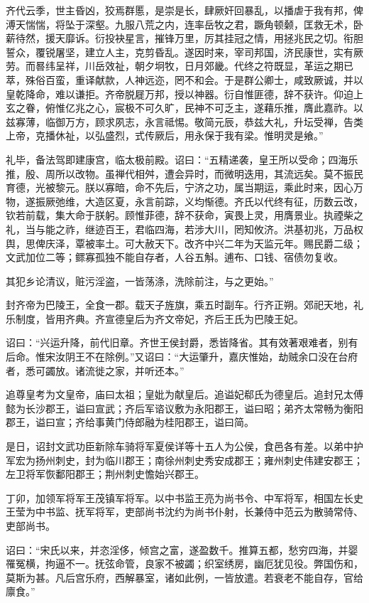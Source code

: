 \documentclass[12pt,UTF8]{ctexbook}
\begin{document}
齐代云季，世主昏凶，狡焉群慝，是崇是长，肆厥奸回暴乱，以播虐于我有邦，俾溥天惴惴，将坠于深壑。九服八荒之内，连率岳牧之君，蹶角顿颡，匡救无术，卧薪待然，援天靡诉。衍投袂星言，摧锋万里，厉其挂冠之情，用拯兆民之切。衔胆誓众，覆锐屠坚，建立人主，克剪昏乱。遂因时来，宰司邦国，济民康世，实有厥劳。而晷纬呈祥，川岳效祉，朝夕坰牧，日月郊畿。代终之符既显，革运之期已萃，殊俗百蛮，重译献款，人神远迩，罔不和会。于是群公卿士，咸致厥诚，并以皇乾降命，难以谦拒。齐帝脱屣万邦，授以神器。衍自惟匪德，辞不获许。仰迫上玄之眷，俯惟亿兆之心，宸极不可久旷，民神不可乏主，遂藉乐推，膺此嘉祚。以兹寡薄，临御万方，顾求夙志，永言祗惕。敬简元辰，恭兹大礼，升坛受禅，告类上帝，克播休祉，以弘盛烈，式传厥后，用永保于我有梁。惟明灵是飨。”

礼毕，备法驾即建康宫，临太极前殿。诏曰：“五精递袭，皇王所以受命；四海乐推，殷、周所以改物。虽禅代相舛，遭会异时，而微明迭用，其流远矣。莫不振民育德，光被黎元。朕以寡暗，命不先后，宁济之功，属当期运，乘此时来，因心万物，遂振厥弛维，大造区夏，永言前踪，义均惭德。齐氏以代终有征，历数云改，钦若前载，集大命于朕躬。顾惟菲德，辞不获命，寅畏上灵，用膺景业。执禋柴之礼，当与能之祚，继迹百王，君临四海，若涉大川，罔知攸济。洪基初兆，万品权舆，思俾庆泽，覃被率土。可大赦天下。改齐中兴二年为天监元年。赐民爵二级；文武加位二等；鳏寡孤独不能自存者，人谷五斛。逋布、口钱、宿债勿复收。

其犯乡论清议，赃污淫盗，一皆荡涤，洗除前注，与之更始。”

封齐帝为巴陵王，全食一郡。载天子旌旗，乘五时副车。行齐正朔。郊祀天地，礼乐制度，皆用齐典。齐宣德皇后为齐文帝妃，齐后王氏为巴陵王妃。

诏曰：“兴运升降，前代旧章。齐世王侯封爵，悉皆降省。其有效著艰难者，别有后命。惟宋汝阴王不在除例。”又诏曰：“大运肇升，嘉庆惟始，劫贼余口没在台府者，悉可蠲放。诸流徙之家，并听还本。”

追尊皇考为文皇帝，庙曰太祖；皇妣为献皇后。追谥妃郗氏为德皇后。追封兄太傅懿为长沙郡王，谥曰宣武；齐后军谘议敷为永阳郡王，谥曰昭；弟齐太常畅为衡阳郡王，谥曰宣；齐给事黄门侍郎融为桂阳郡王，谥曰简。

是日，诏封文武功臣新除车骑将军夏侯详等十五人为公侯，食邑各有差。以弟中护军宏为扬州刺史，封为临川郡王；南徐州刺史秀安成郡王；雍州刺史伟建安郡王；左卫将军恢鄱阳郡王；荆州刺史憺始兴郡王。

丁卯，加领军将军王茂镇军将军。以中书监王亮为尚书令、中军将军，相国左长史王莹为中书监、抚军将军，吏部尚书沈约为尚书仆射，长兼侍中范云为散骑常侍、吏部尚书。

诏曰：“宋氏以来，并恣淫侈，倾宫之富，遂盈数千。推算五都，愁穷四海，并婴罹冤横，拘逼不一。抚弦命管，良家不被蠲；织室绣房，幽厄犹见役。弊国伤和，莫斯为甚。凡后宫乐府，西解暴室，诸如此例，一皆放遣。若衰老不能自存，官给廪食。”
\end{document}
